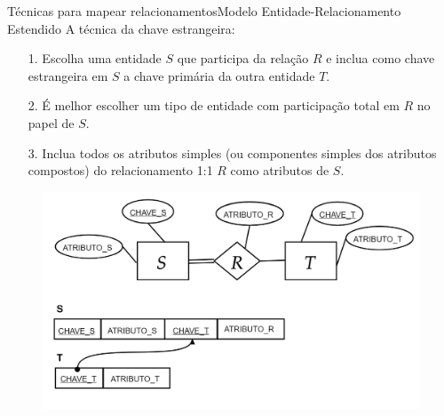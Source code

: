 \documentclass[t]{beamer}
\begin{document}
\begin{ftst}{Técnicas para mapear relacionamentos}{Modelo Entidade-Relacionamento Estendido}
A técnica da chave estrangeira:
\footnotesize
\begin{itemize}
    \item[1.]  Escolha uma entidade $S$ que participa da relação $R$ e inclua como chave estrangeira em $S$ a chave primária da outra entidade $T$. 
    \item[2.] É melhor escolher um tipo de entidade com participação total em $R$ no papel de $S$.
    \item[3.] Inclua todos os atributos simples (ou componentes simples dos atributos compostos) do relacionamento 1:1 $R$ como atributos de $S$.
\end{itemize}
\begin{figure}
    \includegraphics[scale=0.15]{Figuras/03_06.png}
\end{figure}
\end{ftst}

\end{document}
